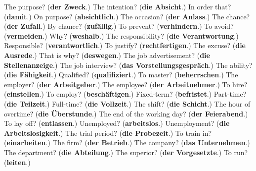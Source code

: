 \begin{tcolorbox}[breakable,colback=teal!4,colframe=teal!35!black,title={Before you move on}]
The purpose? (\textbf{der Zweck}.) The intention? (\textbf{die Absicht}.) In order that? (\textbf{damit}.) On purpose? (\textbf{absichtlich}.) The occasion? (\textbf{der Anlass}.) The chance? (\textbf{der Zufall}.) By chance? (\textbf{zufällig}.) To prevent? (\textbf{verhindern}.) To avoid? (\textbf{vermeiden}.) Why? (\textbf{weshalb}.) The responsibility? (\textbf{die Verantwortung}.) Responsible? (\textbf{verantwortlich}.) To justify? (\textbf{rechtfertigen}.) The excuse? (\textbf{die Ausrede}.) That is why? (\textbf{deswegen}.) The job advertisement? (\textbf{die Stellenanzeige}.) The job interview? (\textbf{das Vorstellungsgespräch}.) The ability? (\textbf{die Fähigkeit}.) Qualified? (\textbf{qualifiziert}.) To master? (\textbf{beherrschen}.) The employer? (\textbf{der Arbeitgeber}.) The employee? (\textbf{der Arbeitnehmer}.) To hire? (\textbf{einstellen}.) To employ? (\textbf{beschäftigen}.) Fixed-term? (\textbf{befristet}.) Part-time? (\textbf{die Teilzeit}.) Full-time? (\textbf{die Vollzeit}.) The shift? (\textbf{die Schicht}.) The hour of overtime? (\textbf{die Überstunde}.) The end of the working day? (\textbf{der Feierabend}.) To lay off? (\textbf{entlassen}.) Unemployed? (\textbf{arbeitslos}.) Unemployment? (\textbf{die Arbeitslosigkeit}.) The trial period? (\textbf{die Probezeit}.) To train in? (\textbf{einarbeiten}.) The firm? (\textbf{der Betrieb}.) The company? (\textbf{das Unternehmen}.) The department? (\textbf{die Abteilung}.) The superior? (\textbf{der Vorgesetzte}.) To run? (\textbf{leiten}.)
\end{tcolorbox}
